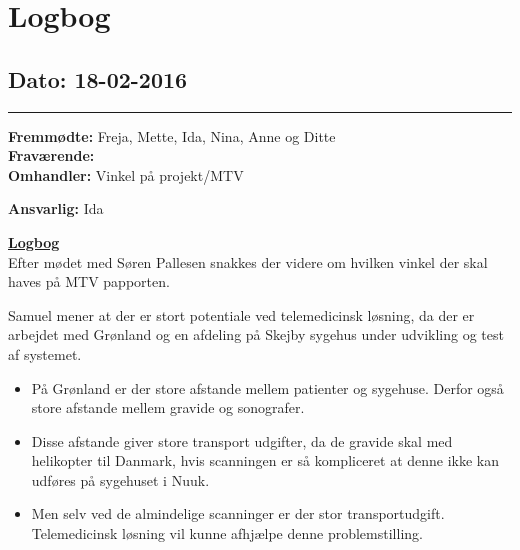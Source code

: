 \chapter{Logbog}
\section{Dato: 18-02-2016}
\hrule
\textbf{Fremmødte:} Freja, Mette, Ida, Nina, Anne og Ditte \\
\textbf{Fraværende: } \\
\textbf{Omhandler:} Vinkel på projekt/MTV

\textbf{Ansvarlig:} Ida 

\underline{\textbf{Logbog}}\\
Efter mødet med Søren Pallesen snakkes der videre om hvilken vinkel der skal haves på MTV papporten. 

Samuel mener at der er stort potentiale ved telemedicinsk løsning, da der er arbejdet med Grønland og en afdeling på Skejby sygehus under udvikling og test af systemet. 
\begin{itemize}
\item På Grønland er der store afstande mellem patienter og sygehuse. Derfor også store afstande mellem gravide og sonografer.
\item Disse afstande giver store transport udgifter, da de gravide skal med helikopter til Danmark, hvis scanningen er så kompliceret at denne ikke kan udføres på sygehuset i Nuuk. 
\item Men selv ved de almindelige scanninger er der stor transportudgift. Telemedicinsk løsning vil kunne afhjælpe denne problemstilling.
\end{itemize}


